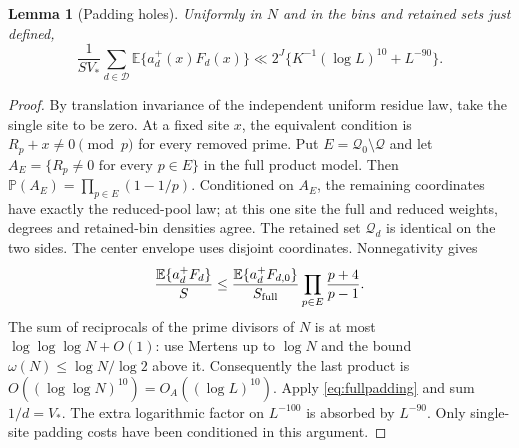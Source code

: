 \documentclass[11pt]{article}
\newtheorem{lemma}[theorem]{Lemma}
\theoremstyle{definition}
\newcommand{\E}{\mathbb E}
\newcommand{\Prob}{\mathbb P}
\begin{document}
\begin{lemma}[Padding holes]\label{lem:paddingholes}
Uniformly in $N$ and in the bins and retained sets just defined,
\begin{equation}\label{eq:paddingholes}
 \frac1{SV_*}\sum_{d\in\mathcal D}\E\{a_d^+(x)F_d(x)\}
 \ll 2^J\{K^{-1}(\log L)^{10}+L^{-90}\}.
\end{equation}
\end{lemma}
\begin{proof}
By translation invariance of the independent uniform residue law, take
the single site to be zero. At a fixed site $x$, the equivalent
condition is $R_p+x\ne0\pmod p$ for every removed prime.
Put $E=\mathcal Q_0\setminus\mathcal Q$ and let
$A_E=\{R_p\ne0\text{ for every }p\in E\}$ in the full product model.
Then $\Prob(A_E)=\prod_{p\in E}(1-1/p)$.
Conditioned on $A_E$, the remaining coordinates have exactly the
reduced-pool law; at this one site the full and reduced weights,
degrees and retained-bin densities agree. The retained set
$\mathcal Q_d$ is identical on the two sides.
The center envelope uses disjoint coordinates. Nonnegativity gives
\[
 \frac{\E\{a_d^+F_d\}}S
 \le\frac{\E\{a_d^+F_{d,0}\}}{S_{\rm full}}
           \prod_{p\in E}\frac{p+4}{p-1}.
\]
The sum of reciprocals of the prime divisors of $N$ is at most
$\log\log\log N+O(1)$: use Mertens up to $\log N$ and the bound
$\omega(N)\le\log N/\log2$ above it.
Consequently the last product is
$O((\log\log N)^{10})=O_A((\log L)^{10})$.
Apply \eqref{eq:fullpadding} and sum $1/d=V_*$.
The extra logarithmic factor on $L^{-100}$ is absorbed by $L^{-90}$.
Only single-site padding costs have been conditioned in this argument.
\end{proof}
\end{document}
